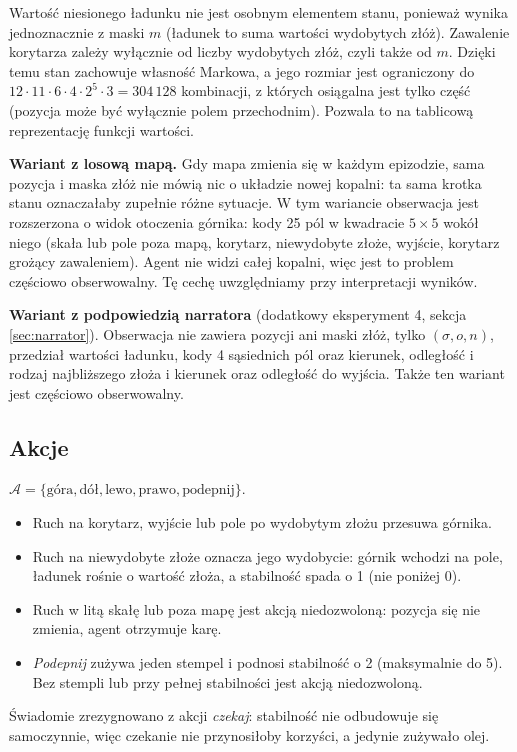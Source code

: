 \documentclass[11pt,a4paper]{article}
\begin{document}
Wartość niesionego ładunku nie jest osobnym elementem stanu, ponieważ wynika
jednoznacznie z maski $m$ (ładunek to suma wartości wydobytych złóż). Zawalenie
korytarza zależy wyłącznie od liczby wydobytych złóż, czyli także od $m$.
Dzięki temu stan zachowuje własność Markowa, a jego rozmiar jest ograniczony do
$12 \cdot 11 \cdot 6 \cdot 4 \cdot 2^5 \cdot 3 = 304\,128$ kombinacji,
z których osiągalna jest tylko część (pozycja może być wyłącznie polem
przechodnim). Pozwala to na tablicową reprezentację funkcji wartości.

\textbf{Wariant z losową mapą.} Gdy mapa zmienia się w każdym epizodzie, sama
pozycja i maska złóż nie mówią nic o układzie nowej kopalni: ta sama krotka
stanu oznaczałaby zupełnie różne sytuacje. W tym wariancie obserwacja jest
rozszerzona o widok otoczenia górnika: kody 25 pól w kwadracie $5\times 5$
wokół niego (skała lub pole poza mapą, korytarz, niewydobyte złoże, wyjście,
korytarz grożący zawaleniem). Agent nie widzi całej kopalni, więc jest to
problem częściowo obserwowalny. Tę cechę uwzględniamy przy interpretacji wyników.

\textbf{Wariant z podpowiedzią narratora} (dodatkowy eksperyment 4, sekcja
\ref{sec:narrator}). Obserwacja nie zawiera pozycji ani maski złóż, tylko
$(\sigma, o, n)$, przedział wartości ładunku, kody 4 sąsiednich pól oraz kierunek,
odległość i rodzaj najbliższego złoża i kierunek oraz odległość do wyjścia. Także
ten wariant jest częściowo obserwowalny.

\subsection{Akcje}
$\mathcal{A} = \{\text{góra}, \text{dół}, \text{lewo}, \text{prawo}, \text{podepnij}\}$.
\begin{itemize}
  \item Ruch na korytarz, wyjście lub pole po wydobytym złożu przesuwa górnika.
  \item Ruch na niewydobyte złoże oznacza jego wydobycie: górnik wchodzi na pole,
  ładunek rośnie o wartość złoża, a stabilność spada o 1 (nie poniżej 0).
  \item Ruch w litą skałę lub poza mapę jest akcją niedozwoloną: pozycja się nie
  zmienia, agent otrzymuje karę.
  \item \emph{Podepnij} zużywa jeden stempel i podnosi stabilność o 2
  (maksymalnie do 5). Bez stempli lub przy pełnej stabilności jest akcją
  niedozwoloną.
\end{itemize}
Świadomie zrezygnowano z akcji \emph{czekaj}: stabilność nie odbudowuje się
samoczynnie, więc czekanie nie przynosiłoby korzyści, a jedynie zużywało olej.
\end{document}
